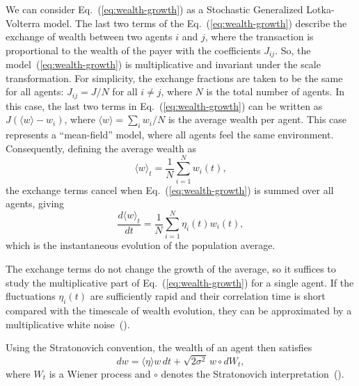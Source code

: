 We can 
consider Eq.~(\ref{eq:wealth-growth}) as a Stochastic Generalized Lotka-Volterra model.
The last two terms of the Eq.~(\ref{eq:wealth-growth}) describe the exchange of wealth between two agents $i$ and $j$, 
where the transaction is proportional to the wealth of the payer with the coefficients $J_{ij}$.
So, the model~(\ref{eq:wealth-growth}) is multiplicative and invariant under the scale transformation. 
For simplicity, the exchange fractions are taken to be the same for all agents: 
$J_{ij} = J/N$ for all $i \neq j$, where $N$ is the total number of agents. 
In this case, the last two terms in Eq.~(\ref{eq:wealth-growth}) can be written as $J(\langle w\rangle - w_i)$, where $\langle w\rangle = \sum_i w_i/N$ is the average wealth per agent. 
This case represents a ``mean-field'' model, where all agents feel the same environment. 
Consequently, defining the average wealth as
\begin{equation}
    \langle w\rangle_t
    =
    \frac{1}{N}\sum_{i=1}^{N} w_i(t),
\end{equation}
the exchange terms cancel when Eq.~(\ref{eq:wealth-growth}) is summed over all agents, giving
\begin{equation}
    \frac{d\langle w\rangle_t}{dt}
    =
    \frac{1}{N}\sum_{i=1}^{N}\eta_i(t)w_i(t),
\end{equation}
which is the instantaneous evolution of the population average.

The exchange terms do not change the growth of the average, so it suffices to
study the multiplicative part of Eq.~(\ref{eq:wealth-growth}) for a single agent.
If the fluctuations $\eta_i(t)$ are sufficiently rapid and their correlation time
is short compared with the timescale of wealth evolution, they can be approximated
by a multiplicative white noise~(\cite{bo2013whitenoise, risken1989fokker}).



Using the Stratonovich convention, the wealth of an agent then satisfies
\begin{equation}
    dw = \langle\eta\rangle w\,dt + \sqrt{2\sigma^2}\,w\circ dW_t,
\end{equation}
where $W_t$ is a Wiener process and $\circ$ denotes the Stratonovich
interpretation~(\cite{stratonovich1967topics}).



